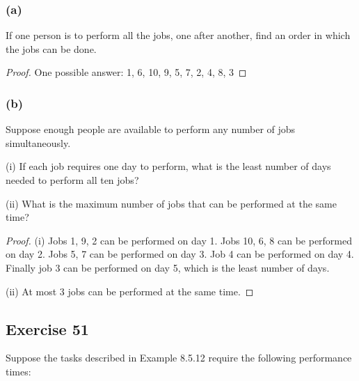 \documentclass[14pt]{extarticle}
\begin{document}
\subsubsection{(a)}
If one person is to perform all the jobs, one after another, find an order in which the jobs can be done.

\begin{proof}
        One possible answer: 1, 6, 10, 9, 5, 7, 2, 4, 8, 3
\end{proof}

\subsubsection{(b)}
Suppose enough people are available to perform any number of jobs simultaneously.

(i) If each job requires one day to perform, what is the least number of days needed to perform all ten jobs?

(ii) What is the maximum number of jobs that can be performed at the same time?

\begin{proof}
        (i) Jobs 1, 9, 2 can be performed on day 1. Jobs 10, 6, 8 can be performed on day 2. Jobs 5, 7 can be performed on
        day 3. Job 4 can be performed on day 4. Finally job 3 can be performed on day 5, which is the least number of days.

        (ii) At most 3 jobs can be performed at the same time.
\end{proof}

\subsection{Exercise 51}
Suppose the tasks described in Example 8.5.12 require the following performance times:
\end{document}
